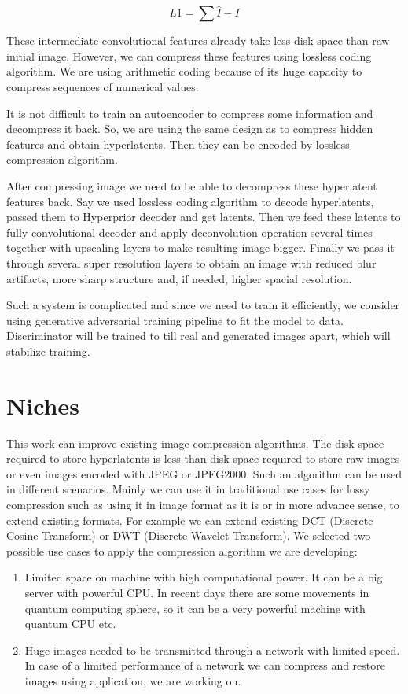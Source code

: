 \begin{equation}
    \label{eq:1}
    L1=\sum \hat{I}-I
\end{equation}

These intermediate convolutional features already take less disk space than raw initial image. However, we can compress these features using lossless coding algorithm. We are using arithmetic coding because of its huge capacity to compress sequences of numerical values.

It is not difficult to train an autoencoder to compress some information and decompress it back. So, we are using the same design as \cite{Ballé_Minnen_Singh_Hwang_Johnston_2018} to compress hidden features and obtain hyperlatents. Then they can be encoded by lossless compression algorithm.

After compressing image we need to be able to decompress these hyperlatent features back. Say we used lossless coding algorithm to decode hyperlatents, passed them to Hyperprior decoder and get latents. Then we feed these latents to fully convolutional decoder and apply deconvolution operation several times together with upscaling layers to make resulting image bigger. Finally we pass it through several super resolution layers to obtain an image with reduced blur artifacts, more sharp structure and, if needed, higher spacial resolution.

Such a system is complicated and since we need to train it efficiently, we consider using generative adversarial training pipeline to fit the model to data. Discriminator will be trained to till real and generated images apart, which will stabilize training.

\chapter{Niches}

This work can improve existing image compression algorithms. The disk space required to store hyperlatents is less than disk space required to store raw images or even images encoded with JPEG or JPEG2000. Such an algorithm can be used in different scenarios. Mainly we can use it in traditional use cases for lossy compression such as using it in image format as it is or in more advance sense, to extend existing formats. For example we can extend existing DCT (Discrete Cosine Transform) or DWT (Discrete Wavelet Transform). We selected two possible use cases to apply the compression algorithm we are developing:

\begin{enumerate}
    \item Limited space on machine with high computational power. It can be a big server with powerful CPU. In recent days there are some movements in quantum computing sphere, so it can be a very powerful machine with quantum CPU etc.
    \item Huge images needed to be transmitted through a network with limited speed. In case of a limited performance of a network we can compress and restore images using application, we are working on.
\end{enumerate}

